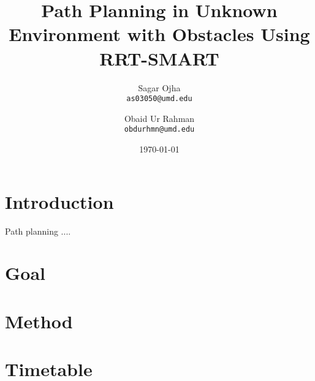 \documentclass[12pt]{extarticle}
\title{Path Planning in Unknown Environment with Obstacles Using RRT-SMART}
\author{
	Sagar Ojha \\
	\texttt{as03050@umd.edu}
	\and
	Obaid Ur Rahman\\
	\texttt{obdurhmn@umd.edu}}
\date{\today}
\begin{document}
\maketitle
\newpage
\section{Introduction}
\hspace{\parindent}Path planning ....

\section{Goal}

\section{Method}

\section{Timetable}


\end{document}
